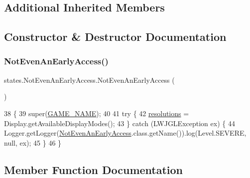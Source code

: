 \subsection*{Additional Inherited Members}


\subsection{Constructor \& Destructor Documentation}
\mbox{\label{classstates_1_1_not_even_an_early_access_a841753f18ba88df25763818e6caa686f}} 
\subsubsection{\texorpdfstring{Not\+Even\+An\+Early\+Access()}{NotEvenAnEarlyAccess()}}
{\footnotesize\ttfamily states.\+Not\+Even\+An\+Early\+Access.\+Not\+Even\+An\+Early\+Access (\begin{DoxyParamCaption}{ }\end{DoxyParamCaption})\hspace{0.3cm}{\ttfamily [inline]}}


\begin{DoxyCode}
38                                   \{
39         super(\mbox{\hyperlink{classstates_1_1_not_even_an_early_access_a4ca6cdcb2fdd87a44bb234689d86057a}{GAME\_NAME}});
40 
41         \textcolor{keywordflow}{try} \{
42             \mbox{\hyperlink{classstates_1_1_not_even_an_early_access_a6ec8bd68962b143c4b5f371ee0b97fc5}{resolutions}} = Display.getAvailableDisplayModes();
43         \} \textcolor{keywordflow}{catch} (LWJGLException ex) \{
44             Logger.getLogger(\mbox{\hyperlink{classstates_1_1_not_even_an_early_access_a841753f18ba88df25763818e6caa686f}{NotEvenAnEarlyAccess}}.class.getName()).log(Level.SEVERE, 
      null, ex);
45         \}
46     \}
\end{DoxyCode}


\subsection{Member Function Documentation}
\mbox{\label{classstates_1_1_not_even_an_early_access_a613e05b7f9a169410878f8d65dc0faab}} 
